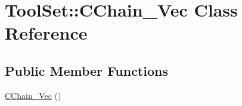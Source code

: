 \hypertarget{classToolSet_1_1CChain__Vec}{
\section{ToolSet::CChain\_\-Vec Class Reference}
\label{classToolSet_1_1CChain__Vec}
}
\subsection*{Public Member Functions}
\begin{DoxyCompactItemize}
\item 
\hypertarget{classToolSet_1_1CChain__Vec_aacdadd594aff8dcf8e5f7634aec76c7d}{
\hyperlink{classToolSet_1_1CChain__Vec_aacdadd594aff8dcf8e5f7634aec76c7d}{CChain\_\-Vec} ()}
\label{classToolSet_1_1CChain__Vec_aacdadd594aff8dcf8e5f7634aec76c7d}


\end{DoxyCompactItemize}
